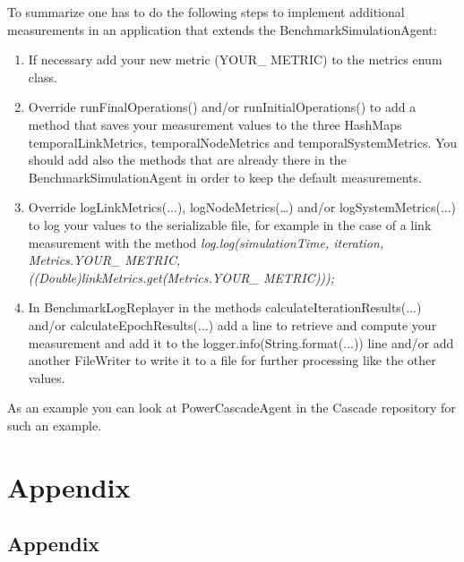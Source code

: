 \documentclass[11pt,fleqn]{book} %
\newcommand{\BenchmarkAgent}{BenchmarkSimulationAgent}
\newcommand{\BenchmarkLogReplayer}{BenchmarkLogReplayer}
\newcommand{\CascadeAgent}{CascadeAgent}
\begin{document}
To summarize one has to do the following steps to implement additional measurements in an application that extends the \BenchmarkAgent{}:
\begin{enumerate}
	\item If necessary add your new metric (YOUR\_ METRIC) to the metrics enum class.
	\item Override runFinalOperations() and/or runInitialOperations() to add a method that saves your measurement values to the three HashMaps temporalLinkMetrics, temporalNodeMetrics and temporalSystemMetrics. You should add also the methods that are already there in the \BenchmarkAgent{} in order to keep the default measurements.
	\item Override logLinkMetrics(...), logNodeMetrics(\dots) and/or logSystemMetrics(...) to log your values to the serializable file, for example in the case of a link measurement with the method \textit{ log.log(simulationTime, iteration, Metrics.YOUR\_ METRIC, \\
	((Double)linkMetrics.get(Metrics.YOUR\_ METRIC)));}
	\item In \BenchmarkLogReplayer{} in the methods calculateIterationResults(...) and/or calculateEpochResults(...) add a line to retrieve and compute your measurement and add it to the logger.info(String.format(...)) line and/or add another FileWriter to write it to a file for further processing like the other values.
\end{enumerate}
As an example you can look at Power\CascadeAgent{} in the Cascade repository for such an example.


\part{Appendix}

\chapter{Appendix}
\end{document}
